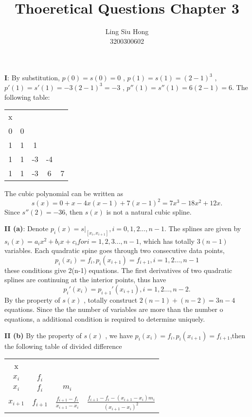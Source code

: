 \documentclass{article}
\title{\textbf{Thoeretical Questions Chapter 3}}
\author{Ling Siu Hong \\ 3200300602}
\begin{document}
\maketitle
\textbf{I}: By substitution, $p(0)=s(0)=0$ , $p(1)=s(1)=(2-1)^{3}$ , $p'(1)=s'(1)=-3(2-1)^{3}=-3$ , $p''(1)=s''(1)=6(2-1)=6$.
The following table:

\begin{tabular}{c|cccc}
x\\
0 & 0 \\
1 & 1 & 1 \\
1 & 1 & -3 & -4 \\ 
1 & 1 & -3 & 6 & 7\\
\end{tabular}

The cubic polynomial can be written as 
\begin{equation*}
    s(x) = 0 + x -4x(x-1) + 7(x-1)^2 = 7x^3 - 18x^2 + 12x.
\end{equation*}
Since $s''(2)=-36$, then $s(x)$ is not a natural cubic spline.

\textbf{II (a)}: Denote $p_i(x)=s|_{[x_i,x_{i+1}]} , i = 0,1,2...,n-1$.
The splines are given by $s_i(x) = a_ix^2 + b_ix + c_i for i = 1,2,3...,n-1$, which has totally $3(n-1)$ variables.
Each quadratic spine goes through two consecutive data points,
\begin{equation*}
    p_i(x_i)=f_i , p_i(x_{i+1})=f_{i+1} , i = 1,2...,n-1
\end{equation*}
these conditions give 2(n-1) equations.
The first derivatives of two quadratic splines are continuing at the interior points, thus have
\begin{equation*}
    p_i'(x_i)=p_{i+1}'(x_{i+1}) , i = 1,2...,n-2.
\end{equation*}
By the property of $s(x)$
, totally construct $2(n-1)+(n-2) = 3n -4$ equations.
Since the the number of variables are more than the number o equations, a additional condition is required to determine uniquely.

\textbf{II (b)} By the property of $s(x)$ , we have $p_i(x_i)=f_i , p_i(x_{i+1})=f_{i+1}$,then the following table of divided difference

\begin{tabular}{c|ccc}
x\\
$x_i$ & $f_i$ \\
$x_i$ & $f_i$ & $m_i$\\
$x_{i+1}$ & $f_{i+1}$ & $\frac{f_{i+1}-f_i}{x_{i+1}-x_i}$ & $\frac{f_{i+1} - f_i -(x_{i+1} - x_i)m_i}{(x_{i+1} - x _ i)^2}$
\end{tabular}
\end{document}
